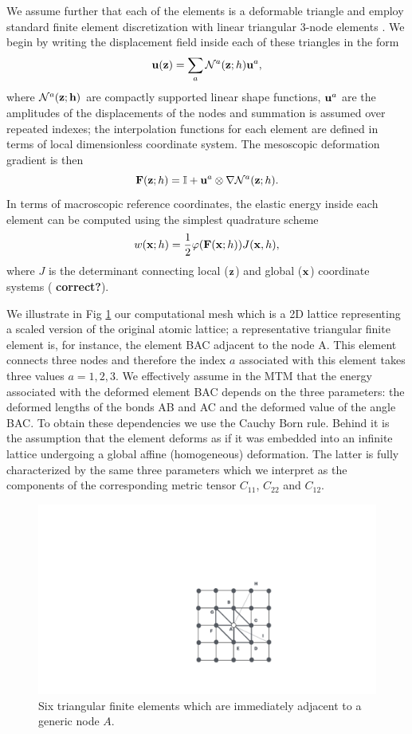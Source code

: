 \documentclass[aps,
superscriptaddress,notitlepage]{revtex4-1}
\def\phi{\varphi}
\begin{document}
We assume further that each  of the  elements  is a deformable triangle and  employ standard finite element discretization with linear triangular 3-node elements  \cite{Irons1966} . We begin by  writing  the displacement field  inside each of these triangles  in the form 
\begin{equation}
 {\bf u} ({\bf z}) = \sum_{a } \mathcal{N} ^a({\bf z};h) {\bf u}^a,
 \end{equation}
 where ${\mathcal N}^a(\bf z;h)$ are   compactly supported  linear shape functions,  ${\bf u}^a$ are the amplitudes of the displacements of the nodes and summation is assumed over repeated indexes; the interpolation functions for each element are defined in terms of   local  dimensionless coordinate system. The mesoscopic deformation gradient is then 
 \begin{equation}
 {\bf F}({\bf z}; h) =\mathbb{I}+ {\bf u} ^a\otimes\nabla\mathcal{N} ^a({\bf z};h). 
 \end{equation}
 In terms of macroscopic reference coordinates,  the elastic energy inside each element can be  computed using the simplest   quadrature scheme 
\begin{equation}
w ({\bf x}; h)=\frac{1}{2}  \phi({\bf F} ({\bf x}; h)) J({\bf x},h),
\end{equation}
where $J$ is the determinant connecting local ($\bf z$)   and global ($\bf x$) coordinate systems (\textbf{ correct?}). 
 
We illustrate in Fig \ref{fig_08} our computational mesh which  is  a 2D   lattice representing a scaled version of the  original atomic lattice; a representative  triangular  finite element is, for instance,   the element BAC adjacent to the node A.  This element connects  three nodes and therefore the index $a$  associated with this element takes three values  $a=1,2,3$. We effectively assume in the MTM that the energy associated with  the deformed element BAC depends on the three parameters:  the deformed lengths  of the bonds AB and AC and   the deformed value of the angle BAC. To obtain these dependencies we use the Cauchy Born rule. Behind it is the assumption  that the element deforms as if it was embedded into   an infinite lattice undergoing a global affine (homogeneous) deformation. The latter is   fully characterized by the same three parameters which we interpret as the components of the corresponding metric tensor $C_{11}$, $C_{22}$ and  $C_{12}$.

\begin{figure}[h!]
\centering
\includegraphics[width=0.2\columnwidth]{figures_ordering/figure_06.pdf}
\caption{Six triangular finite elements which are immediately adjacent to a generic   node $A$. }
\label{fig_08}
\end{figure}
\end{document}
